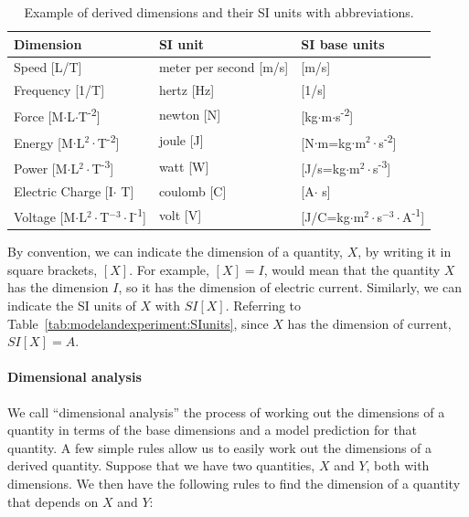 \begin{table}
\centering
\caption[]{Example of derived dimensions and their SI units with abbreviations.}
\label{tab:modelandexperiment:derivedSIunits}
\begin{tabular}{p{}p{}p{}}
\toprule
\textbf{Dimension} & \textbf{SI unit} & \textbf{SI base units} \\
\hline
Speed [L/T] & meter per second [m/s] & [m/s] \\
Frequency [1/T] & hertz [Hz] & [1/s] \\
Force [M$\cdot$L$\cdot$T\textsuperscript{-2}] & newton [N] & [kg$\cdot$m$\cdot$s\textsuperscript{-2}] \\
Energy [M$\cdot$L$^2\cdot$T\textsuperscript{-2}] & joule [J] & [N$\cdot$m=kg$\cdot$m$^2\cdot$s\textsuperscript{-2}] \\
Power [M$\cdot$L$^2\cdot$T\textsuperscript{-3}] & watt [W] & [J/s=kg$\cdot$m$^2\cdot$s\textsuperscript{-3}] \\
Electric Charge [I$\cdot$ T] & coulomb [C] & [A$\cdot$ s] \\
Voltage [M$\cdot$L$^2\cdot$T$^{ -3}\cdot$I\textsuperscript{-1}] & volt [V] & [J/C=kg$\cdot$m$^2\cdot$s$^{ -3}\cdot$A\textsuperscript{-1}] \\
\bottomrule
\end{tabular}
\end{table}

By convention, we can indicate the dimension of a quantity, $X$, by writing it in square brackets, $[X]$. For example, $[X]=I$, would mean that the quantity $X$ has the dimension $I$, so it has the dimension of electric current. Similarly, we can indicate the SI units of $X$ with $SI[X]$. Referring to Table~\ref{tab:modelandexperiment:SIunits}, since $X$ has the dimension of current, $SI[X]=A$.

\paragraph{Dimensional analysis}

We call ``dimensional analysis'' the process of working out the dimensions of a quantity in terms of the base dimensions and a model prediction for that quantity. A few simple rules allow us to easily work out the dimensions of a derived quantity. Suppose that we have two quantities, $X$ and $Y$, both with dimensions. We then have the following rules to find the dimension of a quantity that depends on $X$ and $Y$:

